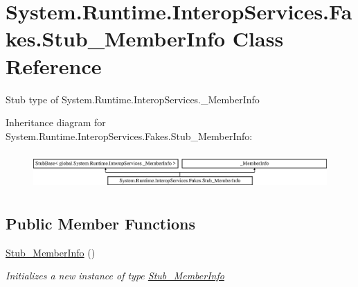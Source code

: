 \hypertarget{class_system_1_1_runtime_1_1_interop_services_1_1_fakes_1_1_stub___member_info}{\section{System.\-Runtime.\-Interop\-Services.\-Fakes.\-Stub\-\_\-\-Member\-Info Class Reference}
\label{class_system_1_1_runtime_1_1_interop_services_1_1_fakes_1_1_stub___member_info}
}


Stub type of System.\-Runtime.\-Interop\-Services.\-\_\-\-Member\-Info 


Inheritance diagram for System.\-Runtime.\-Interop\-Services.\-Fakes.\-Stub\-\_\-\-Member\-Info\-:\begin{figure}[H]
\begin{center}
\leavevmode
\includegraphics[height=1.421320cm]{class_system_1_1_runtime_1_1_interop_services_1_1_fakes_1_1_stub___member_info}
\end{center}
\end{figure}
\subsection*{Public Member Functions}
\begin{DoxyCompactItemize}
\item 
\hyperlink{class_system_1_1_runtime_1_1_interop_services_1_1_fakes_1_1_stub___member_info_a3f6401d9eee07ee495b79d6679abdc76}{Stub\-\_\-\-Member\-Info} ()
\begin{DoxyCompactList}\small\item\em Initializes a new instance of type \hyperlink{class_system_1_1_runtime_1_1_interop_services_1_1_fakes_1_1_stub___member_info}{Stub\-\_\-\-Member\-Info}\end{DoxyCompactList}\end{DoxyCompactItemize}
